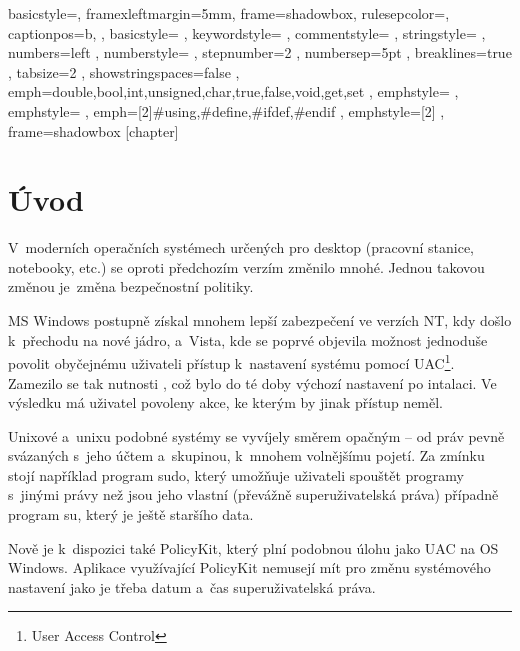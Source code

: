 \renewcommand*\lstlistingname{Výpis}
\setlength{\parskip}{3pt plus 1pt minus 1pt}
\lstset
{
    basicstyle=\footnotesize,
    framexleftmargin=5mm,
    frame=shadowbox,
    rulesepcolor=\color{blue},
    captionpos=b,
, basicstyle=\footnotesize\ttfamily
, keywordstyle=\color{blue}
, commentstyle=\color{OliveGreen}
, stringstyle=\color{Maroon}
, numbers=left
, numberstyle=\scriptsize
, stepnumber=2
, numbersep=5pt
, breaklines=true
, tabsize=2
, showstringspaces=false
, emph={double,bool,int,unsigned,char,true,false,void,get,set}
, emphstyle=\color{blue}
, emphstyle=\color{red}
, emph={[2]\#using,\#define,\#ifdef,\#endif}
, emphstyle={[2]\color{blue}}
, frame=shadowbox
}
[chapter]
\newcommand{\cppc}[1]{\lstinline[language=C++]$#1$}

\chapter{Úvod}
V~moderních operačních systémech určených pro desktop (pracovní stanice, notebooky, etc.) se oproti předchozím verzím změnilo mnohé. Jednou takovou změnou je~změna bezpečnostní politiky.

MS Windows postupně získal mnohem lepší zabezpečení ve verzích NT, kdy došlo k~přechodu na nové jádro, a~Vista, kde se poprvé objevila možnost jednoduše povolit obyčejnému uživateli přístup k~nastavení systému pomocí UAC\footnote{User Access Control}. Zamezilo se tak nutnosti , což bylo do té doby výchozí nastavení po intalaci. Ve výsledku má uživatel povoleny akce, ke kterým by jinak přístup neměl.

Unixové a~unixu podobné systémy se vyvíjely směrem opačným -- od práv pevně svázaných s~jeho účtem a~skupinou, k~mnohem volnějšímu pojetí. Za zmínku stojí například program sudo, který umožňuje uživateli spouštět programy s~jinými právy než jsou jeho vlastní (převážně superuživatelská práva) případně program su, který je ještě staršího data.

Nově je k~dispozici také PolicyKit, který plní podobnou úlohu jako UAC na OS Windows. Aplikace využívající PolicyKit nemusejí mít pro změnu systémového nastavení jako je třeba datum a~čas superuživatelská práva.

